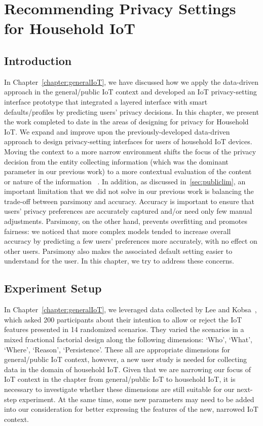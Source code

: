 \chapter{Recommending Privacy Settings for Household IoT}\label{chapter:householdIoT}

\section{Introduction}
In Chapter~\ref{chapter:generalIoT}, we have discussed how we apply the data-driven approach in the general/public IoT context and developed an IoT privacy-setting interface prototype that integrated a layered interface with smart defaults/profiles by predicting users' privacy decisions. In this chapter, we present the work completed to date in the areas of designing for privacy for Household IoT. We expand and improve upon the previously-developed data-driven approach to design privacy-setting interfaces for users of household IoT devices. Moving the context to a more narrow environment shifts the focus of the privacy decision from the entity collecting information (which was the dominant parameter in our previous work) to a more contextual evaluation of the content or nature of the information ~\cite{nissenbaum_privacy_2004}. In addition, as discussed in~\ref{sec:publiclim}, an important limitation that we did not solve in our previous work is balancing the trade-off between parsimony and accuracy. Accuracy is important to ensure that users' privacy preferences are accurately captured and/or need only few manual adjustments. Parsimony, on the other hand, prevents overfitting and promotes fairness: we noticed that more complex models tended to increase overall accuracy by predicting a few users' preferences more accurately, with no effect on other users. Parsimony also makes the associated default setting easier to understand for the user. In this chapter, we try to address these concerns.

\section{Experiment Setup}\label{sec:exp_setup}
In Chapter~\ref{chapter:generalIoT}, we leveraged data collected by Lee and Kobsa~\cite{lee2016understanding}, which asked 200 participants about their intention to allow or reject the IoT features presented in 14 randomized scenarios. They varied the scenarios in a mixed fractional factorial design along the following dimensions: `Who', `What', `Where', `Reason', `Persistence'. These all are appropriate dimensions for general/public IoT context, however, a new user study is needed for collecting data in the domain of household IoT. Given that we are narrowing our focus of IoT context in the chapter from general/public IoT to household IoT, it is necessary to investigate whether these dimensions are still suitable for our next-step experiment. At the same time, some new parameters may need to be added into our consideration for better expressing the features of the new, narrowed IoT context. 


